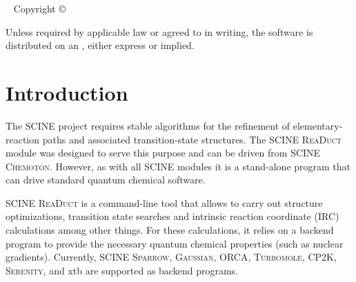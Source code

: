\documentclass[]{tufte-book}
\title[SCINE ReaDuct manual]{User Manual \vskip 0.5em {\setlength{\parindent}{0pt} \Huge SCINE ReaDuct 6.1.0}}
\author[The SCINE ReaDuct Developers]{The SCINE ReaDuct Developers: \newline \noindent Moritz Bensberg, Christoph Brunken, Katja-Sophia Csizi, Stephanie Grimmel, Stefan Gugler, Jan-Grimo Sobez, Miguel Steiner, Paul T\"urtscher, Jan Unsleber, Alain C. Vaucher, Thomas Weymuth, and Markus Reiher}
\newcommand{\monthyear}{%
  \ifcase\month\or January\or February\or March\or April\or May\or June\or
  July\or August\or September\or October\or November\or
  December\fi\space\number\year
}
\begin{document}
\setlength{\parindent}{0pt}

\frontmatter


\maketitle


\newpage
\begin{fullwidth}
~\vfill
\thispagestyle{empty}
\setlength{\parindent}{0pt}
\setlength{\parskip}{\baselineskip}
Copyright \copyright\ \the\year\ \thanklessauthor


\par{}

\par Unless required by applicable law or agreed to in writing, the software
is distributed on an , either express or implied. 

\end{fullwidth}

\tableofcontents




\mainmatter

\let\cleardoublepage\clearpage
\chapter{Introduction}

The SCINE project requires stable algorithms for the refinement of elementary-reaction paths and associated transition-state
structures. The SCINE \textsc{ReaDuct} module was designed to serve this purpose and can be driven from SCINE \textsc{Chemoton}.
However, as with all SCINE modules it is a stand-alone program that can drive standard quantum chemical software.

SCINE \textsc{ReaDuct} is a command-line tool that allows to carry out structure optimizations, transition state searches
and intrinsic reaction coordinate (IRC) calculations among other things.
For these calculations, it relies on a backend program to provide the necessary quantum chemical properties (such
as nuclear gradients). Currently, SCINE \textsc{Sparrow}\cite{sparrow}, \textsc{Gaussian}\cite{gaussian09}, ORCA\cite{orca},
\textsc{Turbomole}\cite{turbomole}, CP2K\cite{cp2k}, \textsc{Serenity}\cite{serenity}, and xtb\cite{xtb} are supported as backend programs.
\end{document}
